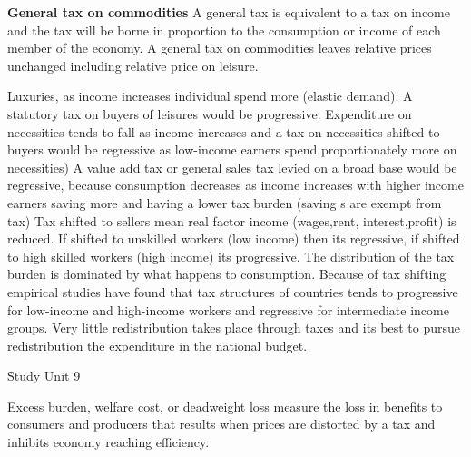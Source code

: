 \documentclass[12pt]{examnotes}
\begin{document}
{\bf General tax on commodities}
\ra A general tax is equivalent to a tax on income and the tax will be borne in proportion to the consumption or income of each member of the economy. 
\ra A general tax on commodities leaves relative prices unchanged including relative price on leisure.

\ra Luxuries, as income increases individual spend more (elastic demand). A statutory tax on buyers of leisures would be progressive. 
\ra Expenditure on necessities tends to fall as income increases and a tax on necessities shifted to buyers would be regressive as low-income earners spend proportionately more on necessities)
\ra A value add tax or general sales tax levied on a broad base would be regressive, because consumption decreases as income increases with higher income earners saving more and having a lower tax burden (saving s are exempt from tax) 
\ra Tax shifted to sellers mean real factor income (wages,rent, interest,profit) is reduced. If shifted to unskilled workers (low income) then its regressive, if shifted to high skilled workers (high income) its progressive.
\ra The distribution of the tax burden is dominated by what happens to consumption.
\ra Because of tax shifting empirical studies have found that tax structures of countries tends to progressive for low-income and high-income workers and regressive for intermediate income groups.
\ra Very little redistribution takes place through taxes and its best to pursue redistribution the expenditure in the national budget.

\h{Study Unit 9}

\ra Excess burden, welfare cost, or deadweight loss measure the loss in benefits to consumers and producers that results when prices are distorted by a tax and inhibits economy reaching efficiency.
\end{document}
